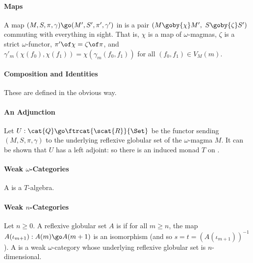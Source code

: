 \paragraph{Maps}

A map $(M,S,\pi,\gamma) \go (M',S',\pi',\gamma')$ in  is a pair $(M
\goby{\chi} M',$ $S \goby{\zeta} S')$ commuting with everything in sight.
That is, $\chi$ is a map of $\omega$-magmas, $\zeta$ is a strict
$\omega$-functor, $\pi' \of \chi = \zeta \of \pi$, and $\gamma'_m(\chi(f_0),
\chi(f_1)) = \chi (\gamma_m(f_0, f_1))$ for all $(f_0, f_1) \in V_M(m)$.

\paragraph{Composition and Identities}

These are defined in the obvious way.



\paragraph{An Adjunction}

Let $U: \cat{Q} \go \ftrcat{\scat{R}}{\Set}$ be the functor sending
$(M,S,\pi,\gamma)$ to the underlying reflexive globular set of the
$\omega$-magma $M$.  It can be shown that $U$ has a left adjoint: so
there is an induced monad $T$ on . 

\paragraph{Weak $\omega$-Categories}

A  is a $T$-algebra.

\paragraph{Weak $n$-Categories}

Let $n\geq 0$.  A reflexive globular set $A$ is  if
for all $m \geq n$, the map $A(\iota_{m+1}): A(m) \go A(m+1)$ is an
isomorphism (and so $s = t = (A(\iota_{m+1}))^{-1}$).  A
 is a weak $\omega$-category whose underlying
reflexive globular set is $n$-dimensional. 




\clearpage






